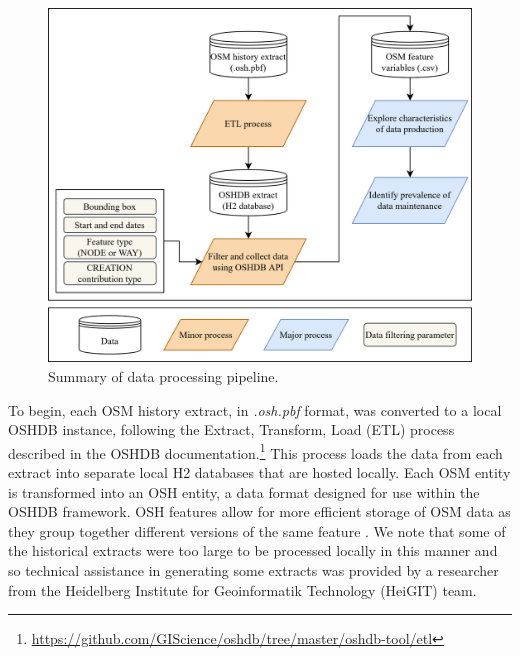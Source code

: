 \begin{figure} %
    \centering %
    \includegraphics[width = \textwidth]{Images/Datapipeline.png} %
    \caption{Summary of data processing pipeline.} %
    \label{fig:pipe} %
\end{figure}

To begin, each OSM history extract, in \textit{.osh.pbf} format, was converted to a local OSHDB instance, following the Extract, Transform, Load (ETL) process described in the OSHDB documentation.\footnote{\url{https://github.com/GIScience/oshdb/tree/master/oshdb-tool/etl}} This process loads the data from each extract into separate local H2 databases that are hosted locally. Each OSM entity is transformed into an OSH entity, a data format designed for use within the OSHDB framework. OSH features allow for more efficient storage of OSM data as they group together different versions of the same feature \parencite{raifer_oshdb_2019}. We note that some of the historical extracts were too large to be processed locally in this manner and so technical assistance in generating some extracts was provided by a researcher from the Heidelberg Institute for Geoinformatik Technology (HeiGIT) team. 

